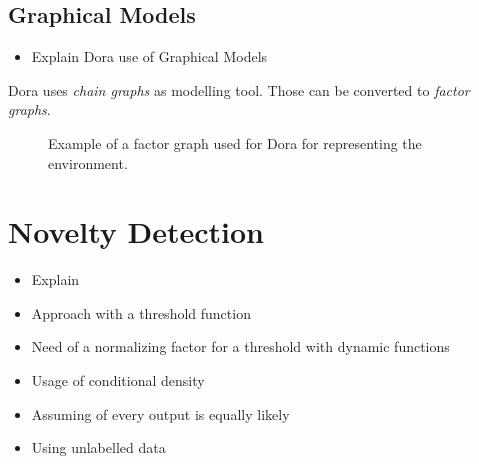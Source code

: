 \documentclass[runningheads,a4paper]{llncs}
\begin{document}
\subsection{Graphical Models}
\begin{itemize}
\item Explain Dora use of Graphical Models
\end{itemize}

Dora uses \emph{chain graphs} as modelling tool. Those can be converted to \emph{factor graphs}\cite{factor}.

\begin{figure}[h]
\centering
{}
\caption{Example of a factor graph used for Dora for representing the environment.}
\end{figure}

\section{Novelty Detection}
\begin{itemize}
\item Explain 
\item Approach with a threshold function
\item Need of a normalizing factor for a threshold with dynamic functions
\item Usage of conditional density
\item Assuming of every output is equally likely
\item Using unlabelled data
\end{itemize}
\end{document}
